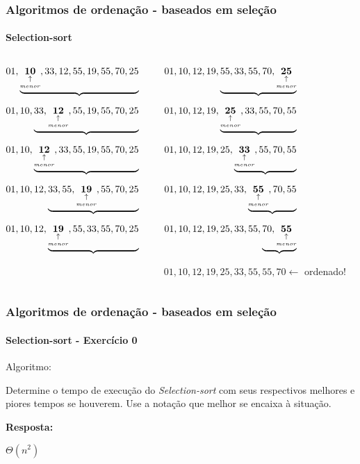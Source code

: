 \begin{frame}
	\frametitle{Algoritmos de ordenação - baseados em seleção}
	\framesubtitle{Selection-sort}
		\begin{columns}
		\begin{column}{0.5\textwidth}
			\par $01,\underbrace{\underset{\underset{menor}{\uparrow}}{\mathbf{10}},33,12,55,19,55,70,25}$
			\pause
			\par $01, 10, \underbrace{33,\underset{\underset{menor}{\uparrow}}{\mathbf{12}},55,19,55,70,25}$
			\pause
			\par $01, 10, \underbrace{\underset{\underset{menor}{\uparrow}}{\mathbf{12}},33,55,19,55,70,25}$
			\pause
			\par $01, 10, 12,\underbrace{33,55,\underset{\underset{menor}{\uparrow}}{\mathbf{19}},55,70,25}$
			\pause
			\par $01, 10, 12,\underbrace{\underset{\underset{menor}{\uparrow}}{\mathbf{19}},55,33,55,70,25}$
		\end{column}
		\begin{column}{0.5\textwidth}
			\par $01, 10, 12, 19,\underbrace{55,33,55,70,\underset{\underset{menor}{\uparrow}}{\mathbf{25}}}$
			\pause
			\par $01, 10, 12, 19,\underbrace{\underset{\underset{menor}{\uparrow}}{\mathbf{25}},33,55,70,55}$
			\pause
			\par $01, 10, 12, 19, 25, \underbrace{\underset{\underset{menor}{\uparrow}}{\mathbf{33}},55,70,55}$
			\pause
			\par $01, 10, 12, 19, 25, 33,\underbrace{\underset{\underset{menor}{\uparrow}}{\mathbf{55}},70,55}$
			\pause
			\par $01, 10, 12, 19, 25, 33, 55, \underbrace{70, \underset{\underset{menor}{\uparrow}}{\mathbf{55}}}$
			\pause
			\par $01, 10, 12, 19, 25, 33, 55, 55, 70 \leftarrow$ ordenado!
		\end{column}
	\end{columns}
\end{frame}

\begin{frame}
	\frametitle{Algoritmos de ordenação - baseados em seleção}
	\framesubtitle{Selection-sort - Exercício 0}
	\par Algoritmo:
	

	\par Determine o tempo de execução do \textit{Selection-sort} com seus respectivos melhores e piores tempos se houverem. Use a notação que melhor se encaixa à situação.
	\pause
	\par \textbf{Resposta:}
	\par $\Theta(n^2)$

\end{frame}

